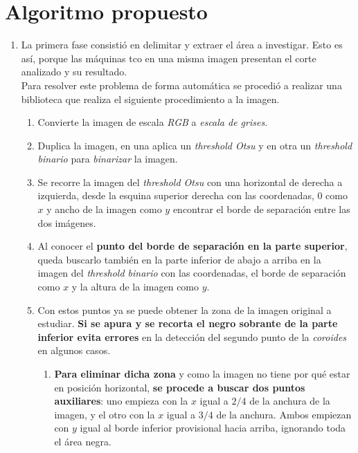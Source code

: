\section{Algoritmo propuesto}
\begin{enumerate}
\item La primera fase consistió en delimitar y extraer el área a
  investigar. Esto es así, porque las máquinas \gls{tco} en una misma
  imagen presentan el corte analizado y su resultado.\\
  Para resolver este problema de forma automática se procedió a
  realizar una biblioteca que realiza el siguiente procedimiento a la
  imagen.
  \begin{enumerate}[label*=\arabic*.]
  \item Convierte la imagen de escala \emph{RGB} a \emph{escala de
      grises}.
  \item Duplica la imagen, en una aplica un \emph{threshold
      Otsu} y en otra un
    \emph{threshold binario} para \emph{binarizar} la imagen.
  \item Se recorre la imagen del \emph{threshold Otsu} con una
    horizontal de derecha a izquierda, desde la esquina superior
    derecha con las coordenadas, $0$ como $x$ y ancho de la imagen
    como $y$ encontrar el borde de separación entre las dos imágenes.
  \item Al conocer el \textbf{punto del borde de separación en la
      parte superior}, queda buscarlo también en la parte inferior de
    abajo a arriba en la imagen del \emph{threshold binario} con las
    coordenadas, el borde de separación como $x$ y la altura de la
    imagen como $y$.
  \item Con estos puntos ya se puede obtener la zona de la imagen
    original a estudiar. \textbf{Si se apura y se recorta el negro
      sobrante de la parte inferior evita errores} en la detección del
    segundo punto de la \emph{\gls{coroides}} en algunos casos.
    \begin{enumerate}[label*=\arabic*.]
    \item \textbf{Para eliminar dicha zona} y como la imagen no tiene
      por qué estar en posición horizontal, \textbf{se procede a
        buscar dos puntos auxiliares}: uno empieza con la $x$ igual a
      $2/4$ de la anchura de la imagen, y el otro con la $x$ igual a
      $3/4$ de la anchura. Ambos empiezan con $y$ igual al borde
      inferior provisional hacia arriba, ignorando toda el área negra.

\end{enumerate}
\end{enumerate}
\end{enumerate}
